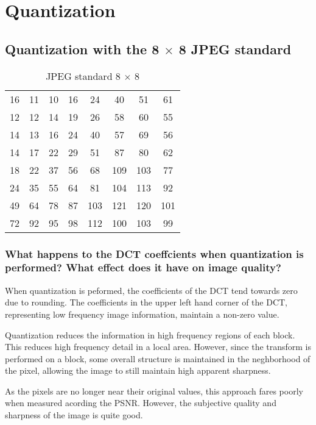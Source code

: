 \section{Quantization}

\subsection{Quantization with the 8 $\times$ 8 JPEG standard}

\begin{table}[tbhc]
	\caption{JPEG standard 8 $\times$ 8}
	\label{tbl:dctm}
	\begin{center}
		\begin{tabular}{ c c c c c c c c}
16 & 11 & 10 & 16 & 24 & 40 & 51 & 61 \\
12 & 12 & 14 & 19 & 26 & 58 & 60 & 55 \\
14 & 13 & 16 & 24 & 40 & 57 & 69 & 56 \\
14 & 17 & 22 & 29 & 51 & 87 & 80 & 62 \\
18 & 22 & 37 & 56 & 68 & 109 & 103 & 77 \\
24 & 35 & 55 & 64 & 81 & 104 & 113 & 92 \\
49 & 64 & 78 & 87 & 103 & 121 & 120 & 101 \\
72 & 92 & 95 & 98 & 112 & 100 & 103 & 99 \\
		\end{tabular}
	\end{center}
\end{table}



\subsubsection{What happens to the DCT coeffcients when quantization is performed? What effect does it have on image quality?}

When quantization is peformed, the coefficients of the DCT tend towards zero due to rounding. The coefficients in the upper left hand corner of the DCT, representing low frequency image information, maintain a non-zero value.

Quantization reduces the information in high frequency regions of each block. This reduces high frequency detail in a local area. However, since the transform is performed on a block, some overall structure is maintained in the neghborhood of the pixel, allowing the image to still maintain high apparent sharpness.

As the pixels are no longer near their original values, this approach fares poorly when measured acording the PSNR. However, the subjective quality and sharpness of the image is quite good.

